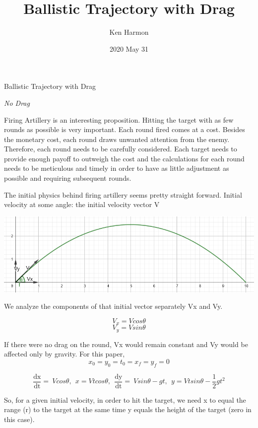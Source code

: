 \documentclass[
]{article}
\title{Ballistic Trajectory with Drag}
\author{Ken Harmon}
\date{2020 May 31}
\begin{document}
\maketitle

\hypertarget{section}{%
\section{}\label{section}}

Ballistic Trajectory with Drag

\emph{No Drag}

Firing Artillery is an interesting proposition. Hitting the target with
as few rounds as possible is very important. Each round fired comes at a
cost. Besides the monetary cost, each round draws unwanted attention
from the enemy. Therefore, each round needs to be carefully considered.
Each target needs to provide enough payoff to outweigh the cost and the
calculations for each round needs to be meticulous and timely in order
to have as little adjustment as possible and requiring subsequent
rounds.

The initial physics behind firing artillery seems pretty straight
forward. Initial velocity at some angle: the initial velocity vector V

\includegraphics{media/bdc6aece00f34d9fb2f177df1c70e766.png}

We analyze the components of that initial vector separately Vx and Vy.

\[V_{x} = Vcos\theta\] \[V_{y} = Vsin\theta\]

If there were no drag on the round, Vx would remain constant and Vy
would be affected only by gravity. For this paper,
\[x_{0} = y_{0} = t_{0} = x_{f} =
y_{f} = 0\]

\[\frac{\text{dx}}{\text{dt}} = \ Vcos\theta,\ \ x = Vtcos\theta,\ \
\frac{\text{dy}}{\text{dt}} = \ Vsin\theta - gt,\ \ y = Vtsin\theta -
\frac{1}{2}gt^{2}\]

So, for a given initial velocity, in order to hit the target, we need x
to equal the range (r) to the target at the same time y equals the
height of the target (zero in this case).
\end{document}
